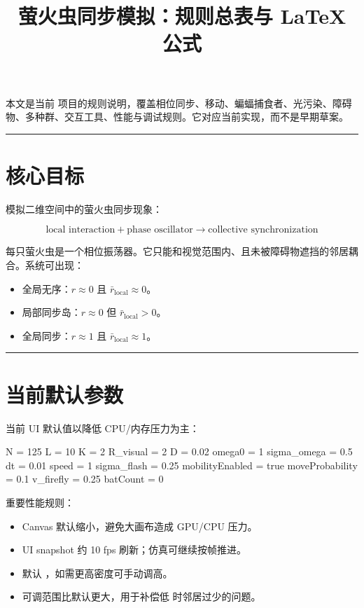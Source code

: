 \documentclass[UTF8]{ctexart}
\title{萤火虫同步模拟：规则总表与 LaTeX 公式}
\author{}
\date{}
\begin{document}
\maketitle
\tableofcontents
\newpage

本文是当前 \texttt{} 项目的规则说明，覆盖相位同步、移动、蝙蝠捕食者、光污染、障碍物、多种群、交互工具、性能与调试规则。它对应当前实现，而不是早期草案。

\bigskip
\hrule
\bigskip

\section{核心目标}

模拟二维空间中的萤火虫同步现象：

\[
\text{local interaction}+\text{phase oscillator}
\longrightarrow
\text{collective synchronization}
\]

每只萤火虫是一个相位振荡器。它只能和视觉范围内、且未被障碍物遮挡的邻居耦合。系统可出现：

\begin{itemize}
\item 全局无序：$r \approx 0$ 且 $\bar r_{\text{local}}\approx 0$。
\item 局部同步岛：$r \approx 0$ 但 $\bar r_{\text{local}}>0$。
\item 全局同步：$r \approx 1$ 且 $\bar r_{\text{local}}\approx 1$。
\end{itemize}

\bigskip
\hrule
\bigskip

\section{当前默认参数}

当前 UI 默认值以降低 CPU/内存压力为主：

\begin{codeblock}
N = 125
L = 10
K = 2
R_visual = 2
D = 0.02
omega0 = 1
sigma_omega = 0.5
dt = 0.01
speed = 1
sigma_flash = 0.25
mobilityEnabled = true
moveProbability = 0.1
v_firefly = 0.25
batCount = 0
\end{codeblock}

重要性能规则：

\begin{itemize}
\item Canvas 默认缩小，避免大画布造成 GPU/CPU 压力。
\item UI snapshot 约 10 fps 刷新；仿真可继续按帧推进。
\item 默认 \texttt{}，如需更高密度可手动调高。
\item \texttt{} 可调范围比默认更大，用于补偿低 \texttt{} 时邻居过少的问题。
\end{itemize}
\end{document}
